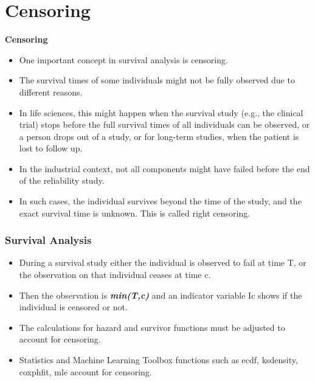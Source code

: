 
	\section{Censoring}
	\begin{frame}
		
		\textbf{Censoring}\\
		\begin{itemize}
			\item One important concept in survival analysis is censoring. 
			\item The survival times of some individuals might not be fully observed due to different reasons. 
			\item In life sciences, this might happen when the survival study (e.g., the clinical trial) stops before the full survival times of all individuals can be observed, or a person drops out of a study, or for long-term studies, when the patient is lost to follow up. 
			\item In the industrial context, not all components might have failed before the end of the reliability study. 
			\item In such cases, the individual survives beyond the time of the study, and the exact survival time is unknown. This is called right censoring.
		\end{itemize}
		
	\end{frame}
	\begin{frame}	
		\frametitle{Survival Analysis}
		\begin{itemize}
			\item 	During a survival study either the individual is observed to fail at time T, or the observation on that individual ceases at time c. 
			\item Then the observation is\textbf{\textit{ min(T,c)}} and an indicator variable Ic shows if the individual is censored or not. 
			\item The calculations for hazard and survivor functions must be adjusted to account for censoring. 
			\item Statistics and Machine Learning Toolbox functions such as ecdf, ksdensity, coxphfit, mle account for censoring.
		\end{itemize}
		
	\end{frame}
